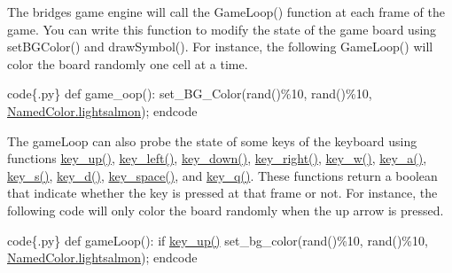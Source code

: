The bridges game engine will call the Game\+Loop() function at each frame of the game. You can write this function to modify the state of the game board using set\+B\+G\+Color() and draw\+Symbol(). For instance, the following Game\+Loop() will color the board randomly one cell at a time.

code\{.py\} def game\+\_\+oop()\+: set\+\_\+\+B\+G\+\_\+\+Color(rand()\%10, rand()\%10, \mbox{\hyperlink{classbridges_1_1named__color_1_1_named_color_a616e82749b8c7711ede2554ce8e3a879}{Named\+Color.\+lightsalmon}}); endcode

The game\+Loop can also probe the state of some keys of the keyboard using functions \mbox{\hyperlink{classbridges_1_1non__blocking__game_1_1_non_blocking_game_a7e853081cefe51511de0c6438aeea871}{key\+\_\+up()}}, \mbox{\hyperlink{classbridges_1_1non__blocking__game_1_1_non_blocking_game_a87490ef28d161f22e753aab5d3e67e46}{key\+\_\+left()}}, \mbox{\hyperlink{classbridges_1_1non__blocking__game_1_1_non_blocking_game_af9a280c2d221140eddba0e4bcb0afb9b}{key\+\_\+down()}}, \mbox{\hyperlink{classbridges_1_1non__blocking__game_1_1_non_blocking_game_a31b6f78c39a93f0ba5350d346043bde9}{key\+\_\+right()}}, \mbox{\hyperlink{classbridges_1_1non__blocking__game_1_1_non_blocking_game_abeb435c75a3022c50f472ee2a4207809}{key\+\_\+w()}}, \mbox{\hyperlink{classbridges_1_1non__blocking__game_1_1_non_blocking_game_a7076d0ff62aeba49a0caf71e213361db}{key\+\_\+a()}}, \mbox{\hyperlink{classbridges_1_1non__blocking__game_1_1_non_blocking_game_a2c587b12c3a8bc2b2e96bd2d09ceed1d}{key\+\_\+s()}}, \mbox{\hyperlink{classbridges_1_1non__blocking__game_1_1_non_blocking_game_a0c90fcb365dcdb7ccf49b98b3e63ecc8}{key\+\_\+d()}}, \mbox{\hyperlink{classbridges_1_1non__blocking__game_1_1_non_blocking_game_a1059ffd8d5daa3a0db2e6847f5724883}{key\+\_\+space()}}, and \mbox{\hyperlink{classbridges_1_1non__blocking__game_1_1_non_blocking_game_a75e94a930466b607828b6ef092f810d6}{key\+\_\+q()}}. These functions return a boolean that indicate whether the key is pressed at that frame or not. For instance, the following code will only color the board randomly when the up arrow is pressed.

code\{.py\} def game\+Loop()\+: if \mbox{\hyperlink{classbridges_1_1non__blocking__game_1_1_non_blocking_game_a7e853081cefe51511de0c6438aeea871}{key\+\_\+up()}} set\+\_\+bg\+\_\+color(rand()\%10, rand()\%10, \mbox{\hyperlink{classbridges_1_1named__color_1_1_named_color_a616e82749b8c7711ede2554ce8e3a879}{Named\+Color.\+lightsalmon}}); endcode

